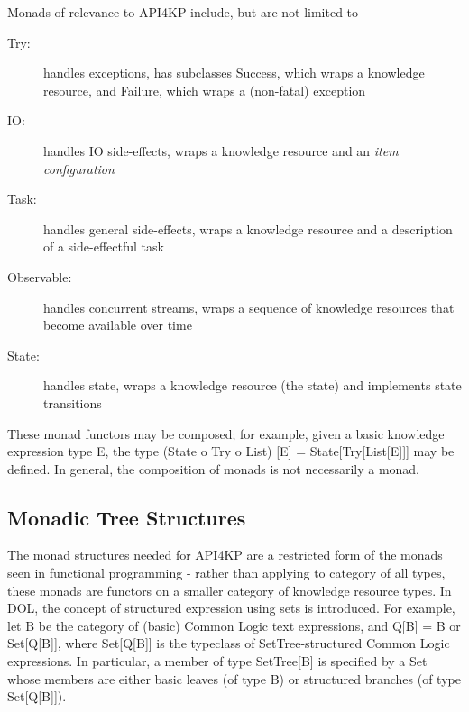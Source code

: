 \documentclass[runningheads]{llncs}
\begin{document}
Monads of relevance to API4KP include, but are not limited to
\begin{description}
\item [Try:] handles exceptions, has subclasses Success, which wraps a knowledge resource, and Failure, which wraps a (non-fatal) exception
\item [IO:] handles IO side-effects, wraps a knowledge resource and an \emph{item configuration}
\item [Task:] handles general side-effects, wraps a knowledge resource and a description of a side-effectful task
\item [Observable:] handles concurrent streams, wraps a sequence of knowledge resources that become available over time
\item [State:] handles state, wraps a knowledge resource (the state) and implements state transitions
\end{description}
These monad functors may be composed; for example, given a basic knowledge expression type E, the type (State o Try o List) [E] = State[Try[List[E]]] may be defined.
In general, the composition of monads is not necessarily a monad. 

\vspace{-0.3cm}
\subsection{Monadic Tree Structures}
The monad structures needed for API4KP are a restricted form of the monads seen in functional programming - rather than applying to category of all types, these monads are functors on a smaller category of knowledge resource types. In DOL, the concept of structured expression using sets is introduced. For example, let B be the category of (basic) Common Logic text expressions, and Q[B] = B or Set[Q[B]], where Set[Q[B]] is the typeclass of SetTree-structured Common Logic expressions. In particular, a member of type SetTree[B] is specified by a Set whose members are either  basic leaves (of type B) or structured branches (of type Set[Q[B]]). 
\end{document}
